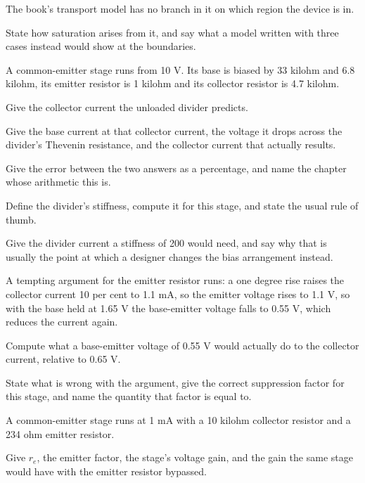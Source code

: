  The book's transport model has no branch in it on which region the device is in.

State how saturation arises from it, and say what a model written with three cases instead would show at the boundaries.

\label{exa:q:6}

A common-emitter stage runs from 10 V. Its base is biased by 33 kilohm and 6.8 kilohm, its emitter resistor is 1 kilohm and its collector resistor is 4.7 kilohm.

 Give the collector current the unloaded divider predicts.

 Give the base current at that collector current, the voltage it drops across the divider's Thevenin resistance, and the collector current that actually results.

Give the error between the two answers as a percentage, and name the chapter whose arithmetic this is.

 Define the divider's stiffness, compute it for this stage, and state the usual rule of thumb.

Give the divider current a stiffness of 200 would need, and say why that is usually the point at which a designer changes the bias arrangement instead.

 A tempting argument for the emitter resistor runs: a one degree rise raises the collector current 10 per cent to 1.1 mA, so the emitter voltage rises to 1.1 V, so with the base held at 1.65 V the base-emitter voltage falls to 0.55 V, which reduces the current again.

Compute what a base-emitter voltage of 0.55 V would actually do to the collector current, relative to 0.65 V.

State what is wrong with the argument, give the correct suppression factor for this stage, and name the quantity that factor is equal to.

\label{exa:q:7}

A common-emitter stage runs at 1 mA with a 10 kilohm collector resistor and a 234 ohm emitter resistor.

 Give $r_e$, the emitter factor, the stage's voltage gain, and the gain the same stage would have with the emitter resistor bypassed.

